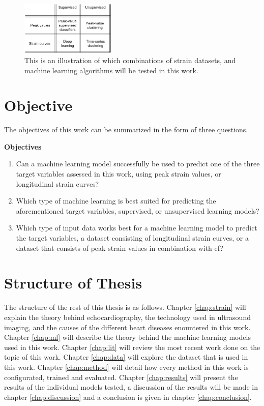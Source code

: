 \begin{figure}[H]
    \centering
    \includegraphics[width=0.4\textwidth]{intro/objectives_diagram.png}
    \caption{This is an illustration of which combinations of strain datasets, and machine learning algorithms will be tested in this work.}
    \label{fig:objectives_diagram}
\end{figure}

\section{Objective} \label{sec:objective}

The objectives of this work can be summarized in the form of three questions.

\begin{tcolorbox}
    \textbf{Objectives}

    \begin{enumerate}
        \item Can a machine learning model successfully be used to predict one of the three target variables assessed in this work, using peak strain values, or longitudinal strain curves?
        \item Which type of machine learning is best suited for predicting the aforementioned target variables, supervised, or unsupervised learning models?
        \item Which type of input data works best for a machine learning model to predict the target variables, a dataset consisting of longitudinal strain curves, or a dataset that consists of peak strain values in combination with \acrshort{ef}?
    \end{enumerate}
\end{tcolorbox}

\section{Structure of Thesis}

The structure of the rest of this thesis is as follows. Chapter \ref{chap:strain} will explain the theory behind echocardiography, the technology used in ultrasound imaging, and the causes of the different heart diseases enountered in this work. Chapter \ref{chap:ml} will describe the theory behind the machine learning models used in this work. Chapter \ref{chap:lit} will review the most recent work done on the topic of this work. Chapter \ref{chap:data} will explore the dataset that is used in this work. Chapter \ref{chap:method} will detail how every method in this work is configurated, trained and evaluated. Chapter \ref{chap:results} will present the results of the individual models tested, a discussion of the results will be made in chapter 
\ref{chap:discussion} and a conclusion is given in chapter \ref{chap:conclusion}.